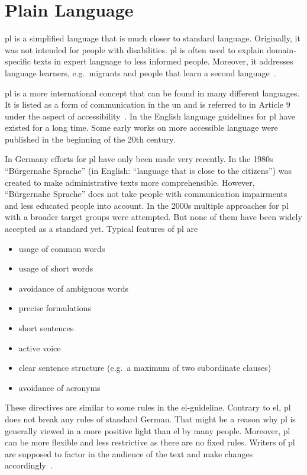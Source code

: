 \section{Plain Language}\label{sec:pl}
\gls{pl} is a simplified language that is much closer to standard language.
Originally, it was not intended for people with disabilities.
\gls{pl} is often used to explain domain-specific texts in expert language to less informed people.
Moreover, it addresses language learners, e.g.\ migrants and people that learn a second language~\autocite{easyLanguageBook}.

\gls{pl} is a more international concept that can be found in many different languages.
It is listed as a form of communication in the \gls{un} and is referred to in Article 9 under the aspect of accessibility~\autocite{un2008}.
In the English language guidelines for \gls{pl} have existed for a long time.
Some early works on more accessible language were published in the beginning of the 20th century.

In Germany efforts for \gls{pl} have only been made very recently.
In the 1980s \enquote{Bürgernahe Sprache} (in English: \enquote{language that is close to the citizens}) was created to make administrative texts more comprehensible.
However, \enquote{Bürgernahe Sprache} does not take people with communication impairments and less educated people into account.
In the 2000s multiple approaches for \gls{pl} with a broader target groups were attempted.
But none of them have been widely accepted as a standard yet.
Typical features of \gls{pl} are
\begin{itemize}[noitemsep]
    \item usage of common words
    \item usage of short words
    \item avoidance of ambiguous words
    \item precise formulations
    \item short sentences
    \item active voice
    \item clear sentence structure (e.g.\ a maximum of two subordinate clauses)
    \item avoidance of acronyms
\end{itemize}
These directives are similar to some rules in the \gls{el}-guideline.
Contrary to \gls{el}, \gls{pl} does not break any rules of standard German.
That might be a reason why \gls{pl} is generally viewed in a more positive light than \gls{el} by many people. %
Moreover, \gls{pl} can be more flexible and less restrictive as there are no fixed rules.
Writers of \gls{pl} are supposed to factor in the audience of the text and make changes accordingly~\autocite{easyLanguageBook}.

